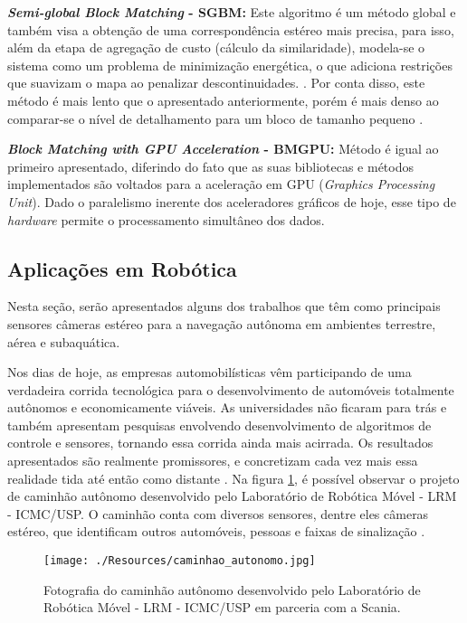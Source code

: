\textbf{\textit{Semi-global Block Matching} - SGBM:} Este algoritmo é um método global e também visa a obtenção de uma correspondência estéreo mais precisa, para isso, além da etapa de agregação de custo (cálculo da similaridade), modela-se o sistema como um problema de minimização energética, o que adiciona restrições que suavizam o mapa ao penalizar descontinuidades.  \cite{JunhwanKim2003}. Por conta disso, este método é mais lento que o apresentado anteriormente, porém é mais denso ao comparar-se o nível de detalhamento para um bloco de tamanho pequeno \cite{Hirschmuller2008}.

\textbf{\textit{Block Matching with GPU Acceleration} - BMGPU:} Método é igual ao primeiro apresentado, diferindo do fato que as suas bibliotecas e métodos implementados são voltados para a aceleração em GPU (\textit{Graphics Processing Unit}). Dado o paralelismo inerente dos aceleradores gráficos de hoje, esse tipo de \textit{hardware} permite o processamento simultâneo dos dados. 


\subsection{Aplicações em Robótica}
\label{aplicacoes_robotica}
Nesta seção, serão apresentados alguns dos trabalhos que têm como principais sensores câmeras estéreo para a navegação autônoma em ambientes terrestre, aérea e subaquática.

Nos dias de hoje, as empresas automobilísticas vêm participando de uma verdadeira corrida tecnológica para o desenvolvimento de automóveis totalmente autônomos e economicamente viáveis. As universidades não ficaram para trás e também apresentam pesquisas envolvendo desenvolvimento de algoritmos de controle e sensores, tornando essa corrida ainda mais acirrada. Os resultados apresentados são realmente promissores, e concretizam cada vez mais essa realidade tida até então como distante \cite{Howard2014}. Na figura \ref{caminhao_autonomo}, é possível observar o projeto de caminhão autônomo desenvolvido pelo Laboratório de Robótica Móvel - LRM - ICMC/USP. O caminhão conta com diversos sensores, dentre eles câmeras estéreo, que identificam outros automóveis, pessoas e faixas de sinalização \cite{ShinzatoP}. 


\begin{figure}[]
 	\centering
 	\texttt{[image: ./Resources/caminhao\_autonomo.jpg]}
 	\caption{Fotografia do caminhão autônomo desenvolvido pelo Laboratório de Robótica Móvel - LRM - ICMC/USP em parceria com a Scania.}
 	\label{caminhao_autonomo}
\end{figure}


